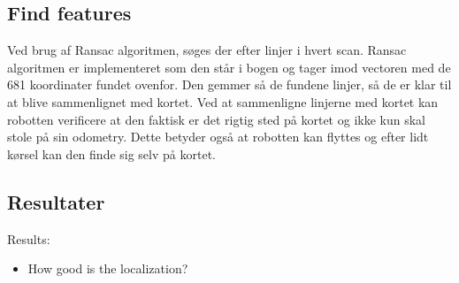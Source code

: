 \subsection{Find features}
Ved brug af Ransac algoritmen, søges der efter linjer i hvert scan. Ransac algoritmen er implementeret som den står i bogen og tager imod vectoren med de 681 koordinater fundet ovenfor. Den gemmer så de fundene linjer, så de er klar til at blive sammenlignet med kortet. Ved at sammenligne linjerne med kortet kan robotten verificere at den faktisk er det rigtig sted på kortet og ikke kun skal stole på sin odometry. Dette betyder også at robotten kan flyttes og efter lidt kørsel kan den finde sig selv på kortet.

\subsection{Resultater}
Results:
\begin{itemize}
\item How good is the localization?
\end{itemize}
